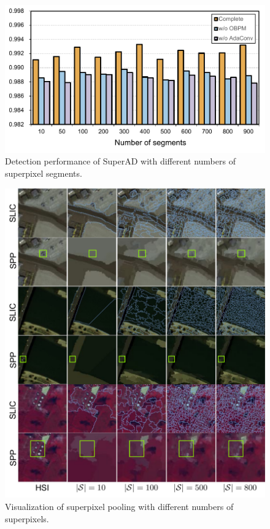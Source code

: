 \begin{figure}[t]
  \centering
  \includegraphics[width=1\linewidth]{Figures/PDF/ana_nsegs.pdf}
  \caption{Detection performance of SuperAD with different numbers of superpixel segments.}
  \label{fig:ana_segs}
\end{figure}

\begin{figure}[htbp]
  \centering
  \includegraphics[width=1\linewidth]{Figures/PDF/viz_spp_slic_all.pdf}
  \caption{Visualization of superpixel pooling with different numbers of superpixels.}
  \label{fig:viz-spp}
\end{figure}



